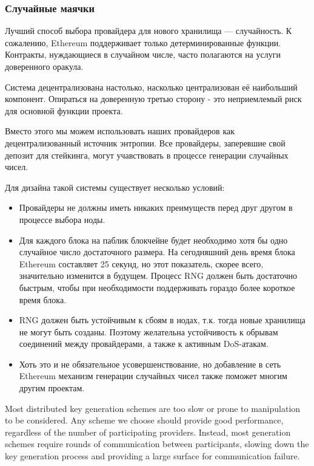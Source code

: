 \documentclass[russian,english,11pt]{article}
\begin{document}
\subsubsection{Случайные маячки}

Лучший способ выбора провайдера для нового хранилища —  случайность. 
К сожалению, Ethereum поддерживает только детерминированные функции. 
Контракты, нуждающиеся в случайном числе, часто полагаются на услуги 
доверенного оракула.

Система децентрализована настолько, насколько централизован её 
наибольший компонент. Опираться на доверенную третью сторону - 
это неприемлемый риск для основной функции проекта.
  
Вместо этого мы можем использовать наших провайдеров как 
децентрализованный источник энтропии. Все провайдеры, заперевшие 
свой депозит для стейкинга, могут учавствовать в процессе 
генерации случайных чисел.
  
Для дизайна такой системы существует несколько условий:

\begin{itemize}
\item Провайдеры не должны иметь никаких преимуществ перед друг 
другом в процессе выбора ноды.
\item Для каждого блока на паблик блокчейне будет необходимо 
хотя бы одно случайное число достаточного размера.
На сегодняшний день время блока Ethereum составляет 25 секунд, 
но этот показатель, скорее всего, значительно изменится в будущем. 
Процесс RNG должен быть достаточно быстрым, чтобы при необходимости 
поддерживать гораздо более короткое время блока.
\item RNG должен быть устойчивым к сбоям в нодах, т.к. тогда 
новые хранилища не могут быть созданы. Поэтому желательна 
устойчивость к обрывам соединений между провайдерами, а также к 
активным DoS-атакам.
\item Хоть это и не обязательное усовершенствование, но добавление 
в сеть Ethereum механизм генерации случайных чисел также поможет 
многим другим проектам.
\end{itemize}

Most distributed key generation schemes are too slow or prone to
manipulation to be considered. Any scheme we choose should provide
good performance, regardless of the number of participating providers.
Instead, most generation schemes require rounds of communication
between participants, slowing down the key generation process and
providing a large surface for communication failure.
\end{document}
